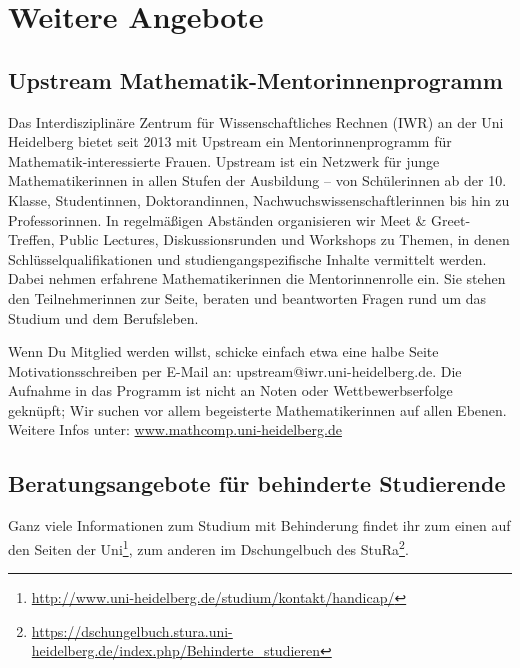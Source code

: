 \section*{Weitere Angebote}

\subsection*{Upstream Mathematik-Mentorinnenprogramm}
Das Interdisziplinäre Zentrum für Wissenschaftliches Rechnen (IWR) an der Uni Heidelberg bietet seit 2013 mit Upstream ein Mentorinnenprogramm für Mathematik-interessierte Frauen. Upstream ist ein Netzwerk für junge Mathematikerinnen in allen Stufen der Ausbildung -- von Schülerinnen ab der 10. Klasse, Studentinnen, Doktorandinnen, Nachwuchswissenschaftlerinnen bis hin zu Professorinnen. In regelmäßigen Abständen organisieren wir Meet \& Greet-Treffen, Public Lectures, Diskussionsrunden und Workshops zu Themen, in denen Schlüsselqualifikationen und studiengangspezifische Inhalte vermittelt werden. Dabei nehmen erfahrene Mathematikerinnen die Mentorinnenrolle ein. Sie stehen den Teilnehmerinnen zur Seite, beraten und beantworten Fragen rund um das Studium und dem Berufsleben.

Wenn Du Mitglied werden willst, schicke einfach etwa eine halbe Seite Motivationsschreiben per E-Mail an: upstream@iwr.uni-heidelberg.de. Die Aufnahme in das Programm ist nicht an Noten oder Wettbewerbserfolge geknüpft; Wir suchen vor allem begeisterte Mathematikerinnen auf allen Ebenen. Weitere Infos unter: \url{www.mathcomp.uni-heidelberg.de}

\subsection*{Beratungsangebote für behinderte Studierende}
Ganz viele Informationen zum Studium mit Behinderung findet ihr zum einen auf den Seiten der Uni\footnote{\url{http://www.uni-heidelberg.de/studium/kontakt/handicap/}}, zum anderen im Dschungelbuch des StuRa\footnote{\url{https://dschungelbuch.stura.uni-heidelberg.de/index.php/Behinderte_studieren}}.
